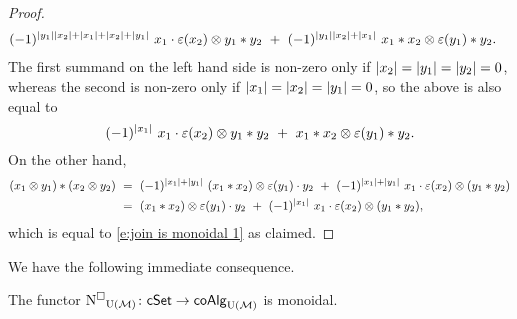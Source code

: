 \begin{proof}
\begin{equation*}
\begin{split}
	(-1)^{\bars{y_1} \bars{x_2} + \bars{x_1} + \bars{x_2} + \bars{y_1}} \ x_1 \cdot \varepsilon(x_2) \otimes y_1 \ast y_2 \ & + \ 
	(-1)^{\bars{y_1} \bars{x_2} + \bars{x_1}} \ x_1 \ast x_2 \otimes \varepsilon(y_1) \ast y_2.
	\end{split}
	\end{equation*}
	The first summand on the left hand side is non-zero only if $\vert{x_2}\vert = \vert{y_1}\vert = \vert{y_2}\vert = 0$, whereas the second is non-zero only if $\vert{x_1}\vert = \vert{x_2}\vert = \vert{y_1}\vert = 0$, so the above is also equal to
	\begin{equation} \label{e:join is monoidal 1}
	(-1)^{\bars{x_1}} \ x_1 \cdot \varepsilon(x_2) \otimes y_1 \ast y_2 \ + \ 
	x_1 \ast x_2 \otimes \varepsilon(y_1) \ast y_2.
	\end{equation}
	On the other hand,
	\begin{align*}
	(x_1 \otimes y_1) \ast (x_2 \otimes y_2) \ & =\ 
	(-1)^{\bars{x_1} + \bars{y_1}} \ (x_1 \ast x_2) \otimes \varepsilon(y_1) \cdot y_2 \ +\
	(-1)^{\bars{x_1} + \bars{y_1}} \ x_1 \cdot \varepsilon(x_2) \otimes (y_1 \ast y_2) \\ \ & =\ 
	(x_1 \ast x_2) \otimes \varepsilon(y_1) \cdot y_2 \ +\
	(-1)^{\bars{x_1}} \ x_1 \cdot \varepsilon(x_2) \otimes (y_1 \ast y_2),
	\end{align*}
	which is equal to \eqref{e:join is monoidal 1} as claimed.
\end{proof}

We have the following immediate consequence.

\begin{theorem} \label{t:lift chains on cSet to UM coAlg is monoidal}
    The functor $\operatorname{N^{\square}}_{\mathrm{U}(\mathcal{M})} \colon \mathsf{cSet} \to \mathsf{coAlg}_{\mathrm{U}(\mathcal{M})}$ is monoidal.
\end{theorem}
